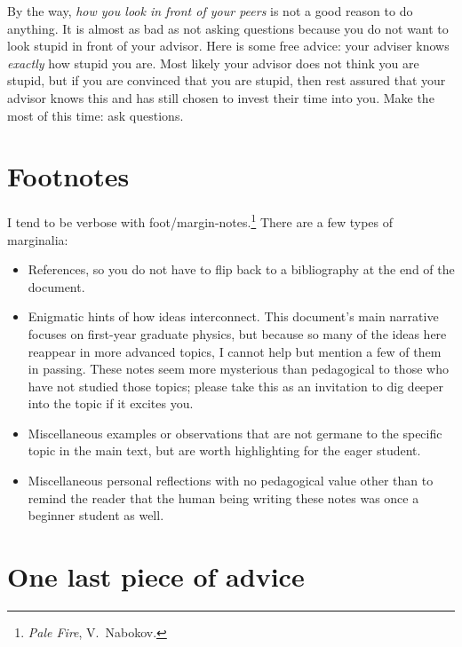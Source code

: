 \documentclass[
  11pt,
	colorful,
	raggedright,
]{tufte-style-thesis-flip}
\begin{document}
By the way, \emph{how you look in front of your peers} is not a good reason to do anything. It is almost as bad as not asking questions because you do not want to look stupid in front of your advisor. Here is some free advice: your adviser knows \emph{exactly} how stupid you are. Most likely your advisor does not think you are stupid, but if you are convinced that you are stupid, then rest assured that your advisor knows this and has still chosen to invest their time into you. Make the most of this time: ask questions.


\section{Footnotes}

I tend to be verbose with foot/margin-notes.\footnote{\emph{Pale Fire}, V.~Nabokov.} There are a few types of marginalia:
\begin{itemize}
  \item References, so you do not have to flip back to a bibliography at the end of the document.
  \item Enigmatic hints of how ideas interconnect. This document's main narrative focuses on first-year graduate physics, but because so many of the ideas here reappear in more advanced topics, I cannot help but mention a few of them in passing. These notes seem more mysterious than pedagogical to those who have not studied those topics; please take this as an invitation to dig deeper into the topic if it excites you.
  \item Miscellaneous examples or observations that are not germane to the specific topic in the main text, but are worth highlighting for the eager student.
  \item Miscellaneous personal reflections with no pedagogical value other than to remind the reader that the human being writing these notes was once a beginner student as well.
\end{itemize}

\section{One last piece of advice}
\end{document}
